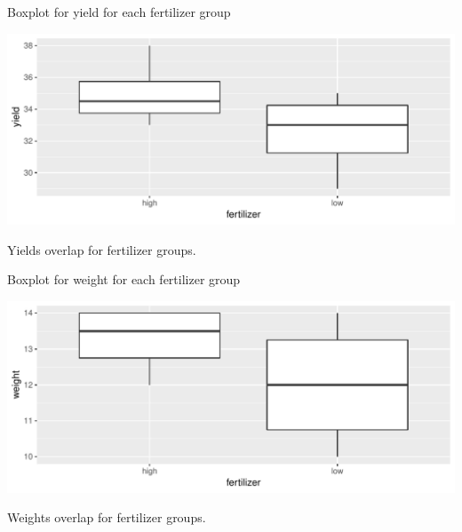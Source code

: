 \begin{frame}[fragile]{Boxplot for yield for each fertilizer group}

 
\begin{knitrout}
\color{fgcolor}\begin{kframe}
\begin{alltt}
\hlstd{(}\hlopt{+}\hlstd{()}
\end{alltt}
\end{kframe}
\includegraphics[width=\maxwidth]{figure/ferto-1} 

\end{knitrout}
  
  

Yields overlap for fertilizer groups.
  
\end{frame}

\begin{frame}[fragile]{Boxplot for weight for each fertilizer group}

 
\begin{knitrout}
\color{fgcolor}\begin{kframe}
\begin{alltt}
\hlstd{(}\hlopt{+}\hlstd{()}
\end{alltt}
\end{kframe}
\includegraphics[width=\maxwidth]{figure/casteldisangro-1} 

\end{knitrout}

Weights overlap for fertilizer groups.
  
\end{frame}

